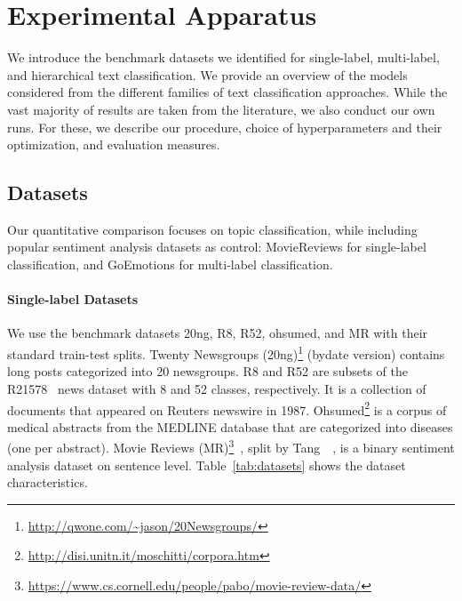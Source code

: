 \documentclass[lettersize,journal]{IEEEtran}
\begin{document}
\section{Experimental Apparatus}\label{sec:apparatus}

We introduce the benchmark datasets we identified for single-label, multi-label, and hierarchical text classification.
We provide an overview of the models considered from the different families of text classification approaches. 
While the vast majority of results are taken from the literature, we also conduct our own runs. 
For these, we describe our procedure, choice of hyperparameters and their optimization, and evaluation measures.

\subsection{Datasets}\label{sec:datasets}

Our quantitative comparison focuses on topic classification, while including popular sentiment analysis datasets as control: 
MovieReviews for single-label classification, and GoEmotions for multi-label classification.

\paragraph{Single-label Datasets} 
We use the benchmark datasets 20ng, R8, R52, ohsumed, and MR with their standard train-test splits.
Twenty Newsgroups (20ng)\footnote{\url{http://qwone.com/~jason/20Newsgroups/}} (bydate version) contains long posts categorized into 20 newsgroups.
R8 and R52 are subsets of the R21578~\cite{reuters} news dataset with 8 and 52 classes, respectively.  
It is a collection of documents that appeared on Reuters newswire in 1987. 
Ohsumed\footnote{\url{http://disi.unitn.it/moschitti/corpora.htm}} is a corpus of medical abstracts from the MEDLINE database that are categorized into diseases (one per abstract). 
Movie Reviews (MR)\footnote{\url{https://www.cs.cornell.edu/people/pabo/movie-review-data/}}~\cite{pang-lee-2005-seeing}, split by Tang~\etal~\cite{DBLP:conf/kdd/TangQM15}, is a binary sentiment analysis dataset on sentence level. 
Table~\ref{tab:datasets} shows the dataset characteristics. 
\end{document}
